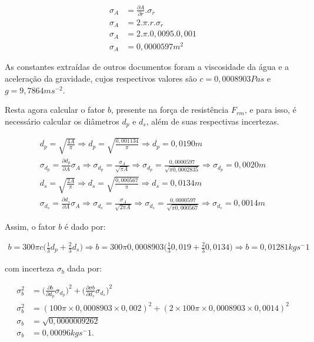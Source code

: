 \documentclass[12pt]{article}
\begin{document}
		\begin{align}
			\sigma_A &= \frac{\partial A}{\partial r}.\sigma_r \nonumber \\
			\sigma_A &= 2.\pi.r.\sigma_r \nonumber \\
			\sigma_A &= 2.\pi.0,0095.0,001 \nonumber \\
			\sigma_A &= 0,0000597 m^2 \nonumber
		\end{align}
		
		As constantes extraídas de outros documentos foram a viscosidade da água e a aceleração da gravidade, cujos respectivos valores são $c=0,0008903 Pas$ e $g=9,7864 ms^{-2}$.
	
		Resta agora calcular o fator $b$, presente na força de resistência $F_{rm}$, e para isso, é necessário calcular os diâmetros $d_p$ e $d_s$, além de suas respectivas incertezas.
		
		\begin{align}
			d_p = \sqrt{\frac{4A}{\pi}} \Rightarrow d_p = \sqrt{\frac{0,001134}{\pi}} \Rightarrow d_p = 0,0190 m  \nonumber \\
			\sigma_{d_p} = \frac{\partial d_p}{\partial A}\sigma_A \Rightarrow \sigma_{d_p} = \frac{\sigma_A}{\sqrt{\pi A}} \Rightarrow \sigma_{d_p} = \frac{0,0000597}{\sqrt{\pi 0,0002835}} \Rightarrow \sigma_{d_p} = 0,0020 m \nonumber \\
			d_s = \sqrt{\frac{2A}{\pi}} \Rightarrow d_s = \sqrt{\frac{0,000567}{\pi}} \Rightarrow d_s = 0,0134 m  \nonumber \\
			\sigma_{d_s} = \frac{\partial d_s}{\partial A}\sigma_A \Rightarrow \sigma_{d_s} = \frac{\sigma_A}{\sqrt{2\pi A}} \Rightarrow \sigma_{d_s} = \frac{0,0000597}{\sqrt{\pi 0,000567}} \Rightarrow \sigma_{d_s} = 0,0014 m \nonumber
		\end{align}
	
		Assim, o fator $b$ é dado por:
	
		\begin{align}
			b=300\pi c \biggr(\frac{1}{3}d_p+\frac{2}{3}d_s\biggl) \Rightarrow b=300\pi 0,0008903\biggr(\frac{1}{3}0,019+\frac{2}{3}0,0134\biggl) \Rightarrow  b=0,01281 kgs^-1 \nonumber
		\end{align}
		
		com incerteza $\sigma_b$ dada por:
		
		\begin{align}
			\sigma_b^2&=\biggr(\frac{\partial b}{\partial d_p} \sigma_{d_p}\biggl)^2+\biggr(\frac{\partial \sigma b}{\partial d_s} \sigma_{d_s}\biggl)^2 \nonumber \\
			\sigma_b^2&=(100\pi \times 0,0008903 \times 0,002)^2+(2\times 100\pi\times 0,0008903\times 0,0014)^2 \nonumber \\
			\sigma_b &=\sqrt{0,0000009262} \nonumber \\
			\sigma_b &= 0,00096 kgs^-1. \nonumber
		\end{align}
	
\end{document}
